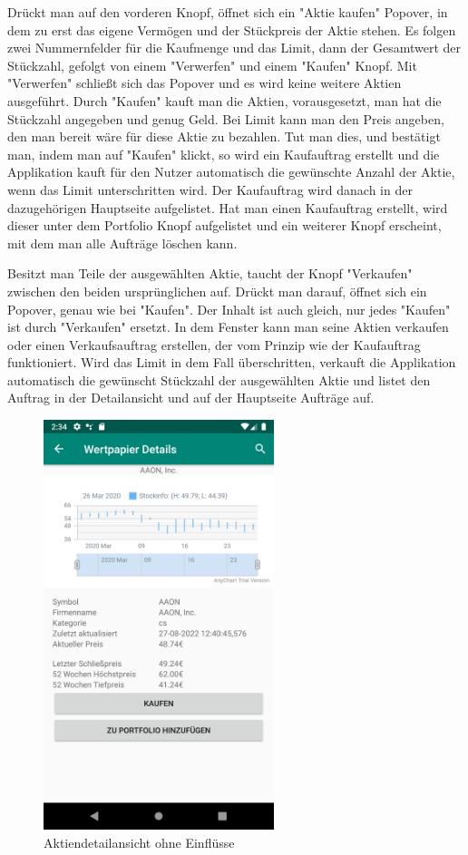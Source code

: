 \documentclass[10pt]{scrartcl}
\begin{document}
Drückt man auf den vorderen Knopf, öffnet sich ein "Aktie kaufen" Popover, in dem zu erst das eigene Vermögen und der Stückpreis der Aktie stehen. Es folgen zwei Nummernfelder für die Kaufmenge und das Limit, dann der Gesamtwert der Stückzahl, gefolgt von einem "Verwerfen" und einem "Kaufen" Knopf. Mit "Verwerfen" schließt sich das Popover und es wird keine weitere Aktien ausgeführt. Durch "Kaufen" kauft man die Aktien, vorausgesetzt, man hat die Stückzahl angegeben und genug Geld. Bei Limit kann man den Preis angeben, den man bereit wäre für diese Aktie zu bezahlen. Tut man dies, und bestätigt man, indem man auf "Kaufen" klickt, so wird ein Kaufauftrag erstellt und die Applikation kauft für den Nutzer automatisch die gewünschte Anzahl der Aktie, wenn das Limit unterschritten wird. Der Kaufauftrag wird danach in der dazugehörigen Hauptseite aufgelistet. Hat man einen Kaufauftrag erstellt, wird dieser unter dem Portfolio Knopf aufgelistet und ein weiterer Knopf erscheint, mit dem man alle Aufträge löschen kann.

Besitzt man Teile der ausgewählten Aktie, taucht der Knopf "Verkaufen" zwischen den beiden ursprünglichen auf. Drückt man darauf, öffnet sich ein Popover, genau wie bei "Kaufen". Der Inhalt ist auch gleich, nur jedes "Kaufen" ist durch "Verkaufen" ersetzt. In dem Fenster kann man seine Aktien verkaufen oder einen Verkaufsauftrag erstellen, der vom Prinzip wie der Kaufauftrag funktioniert. Wird das Limit in dem Fall überschritten, verkauft die Applikation automatisch die gewünscht Stückzahl der ausgewählten Aktie und listet den Auftrag in der Detailansicht und auf der Hauptseite Aufträge auf.

\begin{figure}[H]
	\centering
	\includegraphics[width=0.6\textwidth]{Bilder/Applikation/AktienDetails.png}
	\caption{Aktiendetailansicht ohne Einflüsse}
\end{figure}
\end{document}
